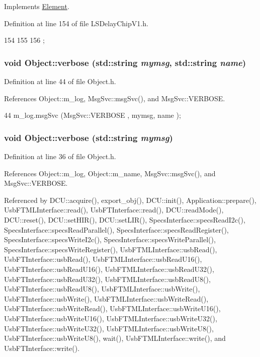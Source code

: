 Implements \hyperlink{classElement_a4e6c83efae95616ebddd03c793a26661}{Element}.

Definition at line 154 of file LSDelayChipV1.h.


\begin{DoxyCode}
154                  {
155     
156   };
\end{DoxyCode}
\hypertarget{classObject_a2d4120195317e2a3c6532e8bb9f3da68}{
\subsubsection[{verbose}]{\setlength{\rightskip}{0pt plus 5cm}void Object::verbose (std::string {\em mymsg}, \/  std::string {\em name})}}
\label{classObject_a2d4120195317e2a3c6532e8bb9f3da68}


Definition at line 44 of file Object.h.

References Object::m\_\-log, MsgSvc::msgSvc(), and MsgSvc::VERBOSE.


\begin{DoxyCode}
44 { m_log.msgSvc (MsgSvc::VERBOSE , mymsg, name ); }
\end{DoxyCode}
\hypertarget{classObject_a83d2db2df682907ea1115ad721c1c4a1}{
\subsubsection[{verbose}]{\setlength{\rightskip}{0pt plus 5cm}void Object::verbose (std::string {\em mymsg})}}
\label{classObject_a83d2db2df682907ea1115ad721c1c4a1}


Definition at line 36 of file Object.h.

References Object::m\_\-log, Object::m\_\-name, MsgSvc::msgSvc(), and MsgSvc::VERBOSE.

Referenced by DCU::acquire(), export\_\-obj(), DCU::init(), Application::prepare(), UsbFTMLInterface::read(), UsbFTInterface::read(), DCU::readMode(), DCU::reset(), DCU::setHIR(), DCU::setLIR(), SpecsInterface::specsReadI2c(), SpecsInterface::specsReadParallel(), SpecsInterface::specsReadRegister(), SpecsInterface::specsWriteI2c(), SpecsInterface::specsWriteParallel(), SpecsInterface::specsWriteRegister(), UsbFTMLInterface::usbRead(), UsbFTInterface::usbRead(), UsbFTMLInterface::usbReadU16(), UsbFTInterface::usbReadU16(), UsbFTMLInterface::usbReadU32(), UsbFTInterface::usbReadU32(), UsbFTMLInterface::usbReadU8(), UsbFTInterface::usbReadU8(), UsbFTMLInterface::usbWrite(), UsbFTInterface::usbWrite(), UsbFTMLInterface::usbWriteRead(), UsbFTInterface::usbWriteRead(), UsbFTMLInterface::usbWriteU16(), UsbFTInterface::usbWriteU16(), UsbFTMLInterface::usbWriteU32(), UsbFTInterface::usbWriteU32(), UsbFTMLInterface::usbWriteU8(), UsbFTInterface::usbWriteU8(), wait(), UsbFTMLInterface::write(), and UsbFTInterface::write().


